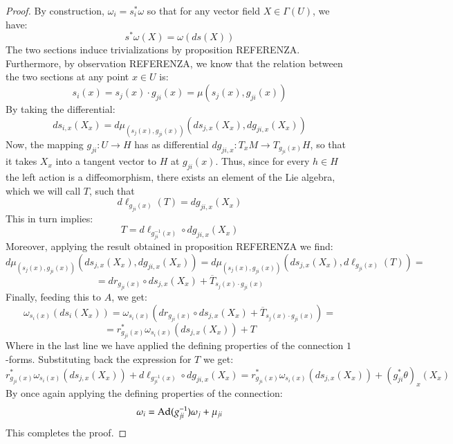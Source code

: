 \documentclass[12pt,a4paper]{report}
\theoremstyle{definition}
\theoremstyle{Theorem}
\theoremstyle{break}
\theoremstyle{definition}
\begin{document}
	\begin{proof}
		By construction, $\omega_i=s_i^*\omega$ so that for any vector field $X\in \Gamma(U)$, we have:
		$$s^*\omega(X)=\omega(ds(X))$$
		The two sections induce trivializations by proposition REFERENZA. Furthermore, by observation REFERENZA, we know that the relation between the two sections at any point $x\in U$ is:
		$$s_i(x)=s_j(x)\cdot g_{ji}(x)=\mu(s_j(x),g_{ji}(x))$$
		By taking the differential:
		$$ds_{i,x}(X_x)=d\mu_{(s_{j}(x), g_{ji}(x))}(ds_{j,x}(X_x),dg_{ji,x}(X_x))$$
		Now, the mapping $g_{ji}:U\rightarrow H$ has as differential $dg_{ji,x}:T_xM\rightarrow T_{g_{ji}(x)}H$, so that it takes $X_x$ into a tangent vector to $H$ at $g_{ji}(x)$. Thus, since for every $h\in H$ the left action is a diffeomorphism, there exists an element of the Lie algebra, which we will call $T$, such that 
		$$d\ell_{g_{ji}(x)}(T)=dg_{ji,x}(X_x)$$
		This in turn implies:
		$$T=d\ell_{g^{-1}_{ji}(x)}\circ dg_{ji,x}(X_x)$$
		Moreover, applying the result obtained in proposition REFERENZA we find:
		$$d\mu_{(s_{j}(x), g_{ji}(x))}(ds_{j,x}(X_x),dg_{ji,x}(X_x))=d\mu_{(s_{j}(x), g_{ji}(x))}(ds_{j,x}(X_x),d\ell_{g_{ji}(x)}(T))=$$
		$$=dr_{g_{ji}(x)}\circ ds_{j,x}(X_x)+\overline{T}_{s_{j}(x)\cdot g_{ji}(x)}$$
		Finally, feeding this to $A$, we get:
		$$\omega_{s_i(x)}(ds_i(X_x))=\omega_{s_i(x)}(dr_{g_{ji}(x)}\circ ds_{j,x}(X_x)+\overline{T}_{s_{j}(x)\cdot g_{ji}(x)})=$$$$=r^*_{g_{ji}(x)}\omega_{{s_i(x)}}(ds_{j,x}(X_x))+T$$
		Where in the last line we have applied the defining properties of the connection $1$-forms. Substituting back the expression for $T$ we get:
		$$r^*_{g_{ji}(x)}\omega_{{s_i(x)}}(ds_{j,x}(X_x))+d\ell_{g^{-1}_{ji}(x)}\circ dg_{ji,x}(X_x)=r^*_{g_{ji}(x)}\omega_{{s_i(x)}}(ds_{j,x}(X_x))+(g^*_{ji}\theta)_x(X_x)$$
		By once again applying the defining properties of the connection:
		$$\omega_i=\hbox{Ad}(g_{ji}^{-1})\omega_j+\mu_{ji}$$
		This completes the proof.
	\end{proof}
\end{document}
